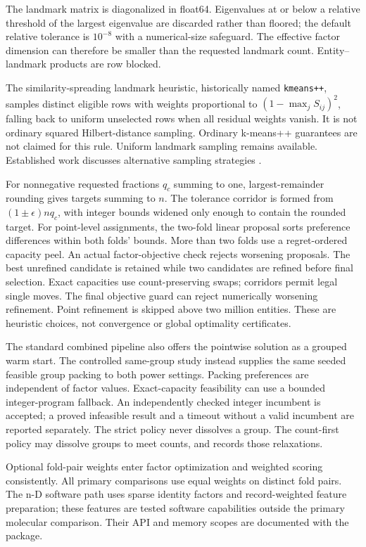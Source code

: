 \documentclass[12pt]{article}
\begin{document}
The landmark matrix is diagonalized in float64. Eigenvalues at or below a
relative threshold of the largest eigenvalue are discarded rather than floored;
the default relative tolerance is $10^{-8}$ with a numerical-size safeguard.
The effective factor dimension can therefore be smaller than the requested
landmark count. Entity--landmark products are row blocked.

The similarity-spreading landmark heuristic, historically named
\texttt{kmeans++}, samples distinct eligible rows with weights proportional to
$(1-\max_j S_{ij})^2$, falling back to uniform unselected rows when all residual
weights vanish. It is not ordinary squared Hilbert-distance sampling.
Ordinary k-means++ guarantees are not claimed for this rule. Uniform landmark
sampling remains available. Established work discusses alternative sampling
strategies \citep{kumar2012,musco2017}.

For nonnegative requested fractions $q_c$ summing to one, largest-remainder
rounding gives targets summing to $n$. The tolerance corridor is formed from
$(1\pm\epsilon)nq_c$, with integer bounds widened only enough to contain the
rounded target. For point-level assignments, the two-fold linear proposal sorts
preference differences within both folds' bounds. More than two folds use a
regret-ordered capacity peel. An actual factor-objective check rejects worsening
proposals. The best unrefined candidate is retained while two candidates are
refined before final selection. Exact capacities use count-preserving swaps;
corridors permit legal single moves. The final objective guard can reject
numerically worsening refinement. Point refinement is skipped above two million
entities. These are heuristic choices, not convergence or global optimality
certificates.

The standard combined pipeline also offers the pointwise solution as a
grouped warm start. The controlled same-group study instead supplies the same
seeded feasible group packing to both power settings. Packing preferences are
independent of factor values. Exact-capacity feasibility can use a bounded
integer-program fallback. An independently checked integer incumbent is accepted;
a proved infeasible result and a timeout without a valid incumbent are reported
separately. The strict policy never dissolves a group. The count-first policy
may dissolve groups to meet counts, and records those relaxations.

Optional fold-pair weights enter factor optimization and weighted scoring
consistently. All primary comparisons use equal weights on distinct fold pairs.
The n-D software path uses sparse identity factors and record-weighted feature
preparation; these features are tested software capabilities outside the primary
molecular comparison. Their API and memory scopes are documented with the
package.
\end{document}
